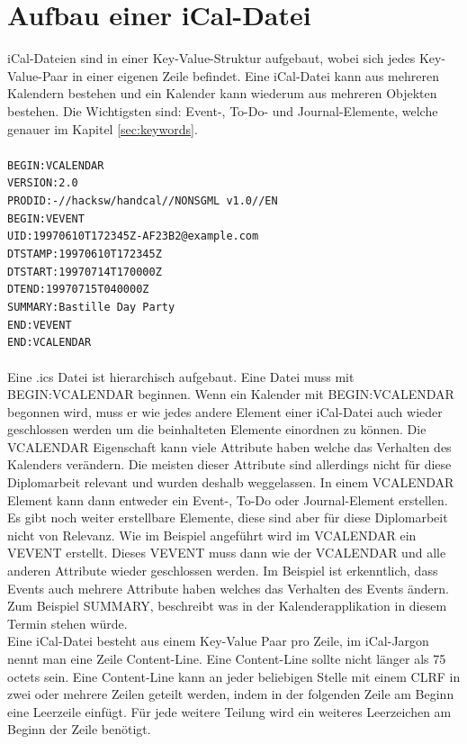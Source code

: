 \section{Aufbau einer iCal-Datei}
\label{sec:aufbauEineriCalDatei}
iCal-Dateien sind in einer Key-Value-Struktur aufgebaut, wobei sich jedes Key-Value-Paar in einer eigenen Zeile befindet. Eine iCal-Datei kann aus mehreren Kalendern bestehen und ein Kalender kann wiederum aus mehreren Objekten bestehen. Die Wichtigsten sind: Event-, To-Do- und Journal-Elemente, welche genauer im Kapitel \ref{sec:keywords}.\\\\
\texttt{BEGIN:VCALENDAR\\
 VERSION:2.0\\
 PRODID:-//hacksw/handcal//NONSGML v1.0//EN\\
 BEGIN:VEVENT\\
 UID:19970610T172345Z-AF23B2@example.com\\
 DTSTAMP:19970610T172345Z\\
 DTSTART:19970714T170000Z\\
 DTEND:19970715T040000Z\\
 SUMMARY:Bastille Day Party\\
 END:VEVENT\\
 END:VCALENDAR}\\\\
Eine .ics Datei ist hierarchisch aufgebaut. Eine Datei muss mit BEGIN:VCALENDAR beginnen. Wenn ein Kalender mit BEGIN:VCALENDAR begonnen wird, muss er wie jedes andere Element einer iCal-Datei auch wieder geschlossen werden um die beinhalteten Elemente einordnen zu können. Die VCALENDAR Eigenschaft kann viele Attribute haben welche das Verhalten des Kalenders verändern. Die meisten dieser Attribute sind allerdings nicht für diese Diplomarbeit relevant und wurden deshalb weggelassen. In einem VCALENDAR Element kann dann entweder ein Event-, To-Do oder Journal-Element erstellen. Es gibt noch weiter erstellbare Elemente, diese sind aber für diese Diplomarbeit nicht von Relevanz. Wie im Beispiel angeführt wird im VCALENDAR ein VEVENT erstellt. Dieses VEVENT muss dann wie der VCALENDAR und alle anderen Attribute wieder geschlossen werden. Im Beispiel ist erkenntlich, dass Events auch mehrere Attribute haben welches das Verhalten des Events ändern. Zum Beispiel SUMMARY, beschreibt was in der Kalenderapplikation in diesem Termin stehen würde.\\
Eine iCal-Datei besteht aus einem Key-Value Paar pro Zeile, im iCal-Jargon nennt man eine Zeile Content-Line. Eine Content-Line sollte nicht länger als 75 octets sein. Eine Content-Line kann an jeder beliebigen Stelle mit einem CLRF in zwei oder mehrere Zeilen geteilt werden, indem in der folgenden Zeile am Beginn eine Leerzeile einfügt. Für jede weitere Teilung wird ein weiteres Leerzeichen am Beginn der Zeile benötigt. \\\\
